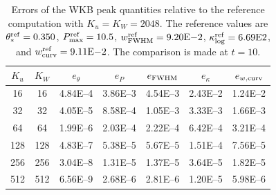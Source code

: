 \documentclass[11pt]{article}
\begin{document}
\newpage
\begin{table}[htbp]
\centering
\caption{Errors of the WKB peak quantities relative to the reference computation with
$K_u=K_W=2048$. The reference values are
$\theta_*^{\rm ref}=0.350$,
$P_{\max}^{\rm ref}=10.5$,
$w_{\rm FWHM}^{\rm ref}=9.20{\rm E}{-2}$,
$\kappa_{\log}^{\rm ref}=6.69{\rm E}{2}$, and
$w_{\rm curv}^{\rm ref}=9.11{\rm E}{-2}$.
The comparison is made at $t=10$.}
\label{tab:wkb_peak_errors_ref2048}
\begin{tabular}{ccccccc}
\hline
$K_u$ & $K_W$ & $e_\theta$ & $e_P$ & $e_{\rm FWHM}$ & $e_\kappa$ & $e_{w,{\rm curv}}$ \\
\hline
16   & 16   & 4.84E--4 & 3.86E--3 & 4.54E--3 & 2.43E--2 & 1.24E--2 \\
32   & 32   & 4.05E--5 & 8.58E--4 & 1.05E--3 & 3.33E--3 & 1.66E--3 \\
64   & 64   & 1.99E--6 & 2.03E--4 & 2.22E--4 & 6.42E--4 & 3.21E--4 \\
128   & 128   & 4.83E--7 & 5.38E--5 & 5.67E--5 & 1.51E--4 & 7.56E--5 \\
256  & 256  & 3.04E--8 & 1.31E--5 & 1.37E--5 & 3.64E--5 & 1.82E--5 \\
512  & 512  & 6.56E--9 & 2.68E--6 & 2.81E--6 & 1.20E--5 & 5.98E--6 \\
\hline
\end{tabular}
\end{table}
\end{document}
